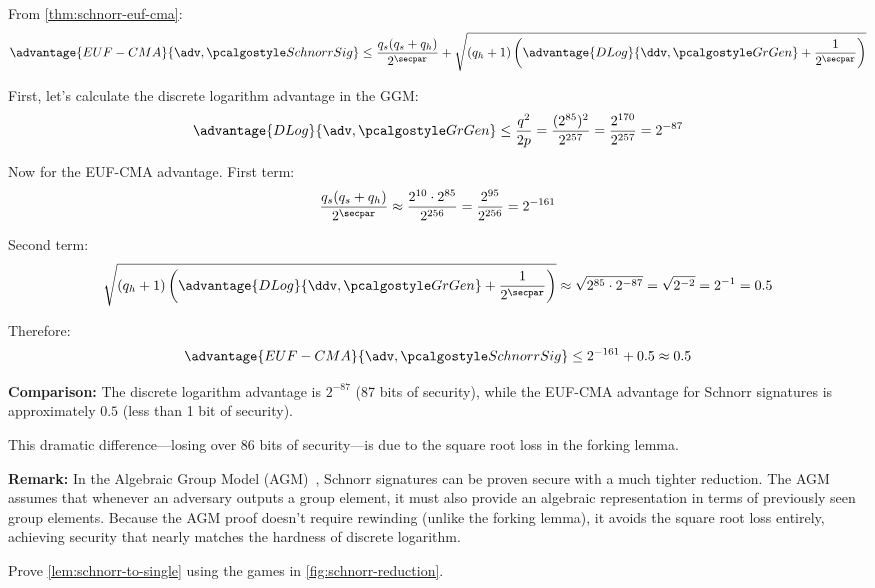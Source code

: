 \ifsolutions
\begin{mysolution}
  From \autoref{thm:schnorr-euf-cma}:
  \[
    \advantage{EUF-CMA}{\adv, \algo{SchnorrSig}} \leq \frac{q_s(q_s + q_h)}{2^\secpar} + \sqrt{(q_h + 1) \left(\advantage{DLog}{\ddv, \grgen} + \frac{1}{2^\secpar}\right)}
  \]
  
  First, let's calculate the discrete logarithm advantage in the GGM:
  \[
    \advantage{DLog}{\adv, \grgen} \leq \frac{q^2}{2p} = \frac{(2^{85})^2}{2^{257}} = \frac{2^{170}}{2^{257}} = 2^{-87}
  \]
  
  Now for the EUF-CMA advantage. First term:
  \[
    \frac{q_s(q_s + q_h)}{2^\secpar} \approx \frac{2^{10} \cdot 2^{85}}{2^{256}} = \frac{2^{95}}{2^{256}} = 2^{-161}
  \]
  
  Second term:
  \[
    \sqrt{(q_h + 1) \left(\advantage{DLog}{\ddv, \grgen} + \frac{1}{2^\secpar}\right)} \approx \sqrt{2^{85} \cdot 2^{-87}} = \sqrt{2^{-2}} = 2^{-1} = 0.5
  \]
  
  Therefore:
  \[
    \advantage{EUF-CMA}{\adv, \algo{SchnorrSig}} \leq 2^{-161} + 0.5 \approx 0.5
  \]
  
  \textbf{Comparison:} The discrete logarithm advantage is $2^{-87}$ (87 bits of security), while the EUF-CMA advantage for Schnorr signatures is approximately $0.5$ (less than 1 bit of security). 
  
  This dramatic difference—losing over 86 bits of security—is due to the square root loss in the forking lemma. 
  
  \textbf{Remark:} In the Algebraic Group Model (AGM)~\cite{C:FucKilLos18}, Schnorr signatures can be proven secure with a much tighter reduction. The AGM assumes that whenever an adversary outputs a group element, it must also provide an algebraic representation in terms of previously seen group elements. Because the AGM proof doesn't require rewinding (unlike the forking lemma), it avoids the square root loss entirely, achieving security that nearly matches the hardness of discrete logarithm.
\end{mysolution}
\fi

\begin{exercise}\label{ex:schnorr-to-single}
  Prove \autoref{lem:schnorr-to-single} using the games in \autoref{fig:schnorr-reduction}.
\end{exercise}

